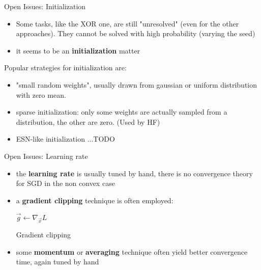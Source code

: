  
\begin{frame}{Open Issues: Initialization}
	
	\begin{itemize}
		\item Some tasks, like the XOR one, are still "unresolved" (even for the other approaches). They cannot be solved with high probability (varying the seed)
		\item it seems to be an \textbf{initialization} matter
	\end{itemize}
	
	Popular strategies for initialization are:
	\begin{itemize}
		\item "small random weights", usually drawn from gaussian or uniform distribution with zero mean. 
		\item sparse initialization: only some weights are actually sampled from a distribution, the other are zero. (Used by HF)
		\item ESN-like initialization ...TODO
	\end{itemize}
	
\end{frame}

\begin{frame}{Open Issues: Learning rate}
	
	\begin{itemize}	
		\item 	the \textbf{learning rate} is usually tuned by hand, there is no convergence theory for SGD in the non convex case
		\item a \textbf{gradient clipping} technique is often employed:
		\begin{algorithm}[H]
			$\vec{g} \gets \nabla_{\vec{x}} L$\\
			\caption{Gradient clipping}
			\label{algo:gradClipping}
		\end{algorithm}
		
		\item  some \textbf{momentum} or \textbf{averaging} technique often yield better convergence time, again tuned by hand
	\end{itemize}
	

\end{frame}